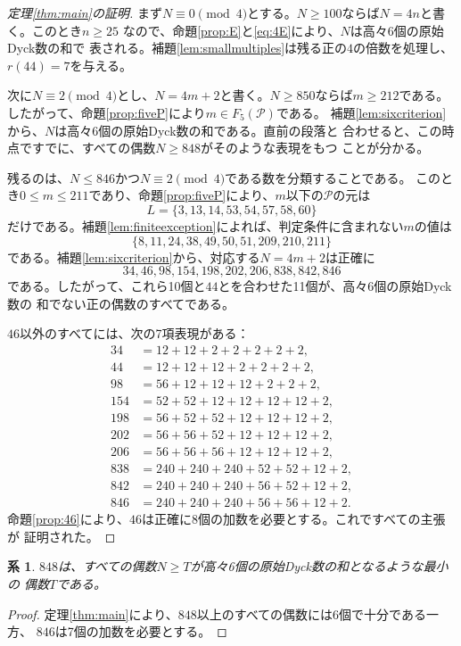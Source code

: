 \documentclass[12pt]{ltjsarticle}
\theoremstyle{plain}
\newtheorem{corollary}[theorem]{系}
\newcommand{\Pset}{\mathcal P}
\begin{document}
\begin{proof}[定理\ref{thm:main}の証明]
まず$N\equiv0\pmod4$とする。$N\geq100$ならば$N=4n$と書く。このとき$n\geq25$
なので、命題\ref{prop:E}と\eqref{eq:4E}により、$N$は高々6個の原始Dyck数の和で
表される。補題\ref{lem:smallmultiples}は残る正の$4$の倍数を処理し、
$r(44)=7$を与える。

次に$N\equiv2\pmod4$とし、$N=4m+2$と書く。$N\geq850$ならば$m\geq212$である。
したがって、命題\ref{prop:fiveP}により$m\in F_5(\Pset)$である。
補題\ref{lem:sixcriterion}から、$N$は高々6個の原始Dyck数の和である。直前の段落と
合わせると、この時点ですでに、すべての偶数$N\geq848$がそのような表現をもつ
ことが分かる。

残るのは、$N\leq846$かつ$N\equiv2\pmod4$である数を分類することである。
このとき$0\leq m\leq211$であり、命題\ref{prop:fiveP}により、$m$以下の$\Pset$の元は
\[
 L=\{3,13,14,53,54,57,58,60\}
\]
だけである。補題\ref{lem:finiteexception}によれば、判定条件に含まれない$m$の値は
\[
 \{8,11,24,38,49,50,51,209,210,211\}
\]
である。補題\ref{lem:sixcriterion}から、対応する$N=4m+2$は正確に
\[
 34,46,98,154,198,202,206,838,842,846
\]
である。したがって、これら10個と$44$とを合わせた11個が、高々6個の原始Dyck数の
和でない正の偶数のすべてである。

$46$以外のすべてには、次の7項表現がある：
\[
\begin{aligned}
34&=12+12+2+2+2+2+2,\\
44&=12+12+12+2+2+2+2,\\
98&=56+12+12+12+2+2+2,\\
154&=52+52+12+12+12+12+2,\\
198&=56+52+52+12+12+12+2,\\
202&=56+56+52+12+12+12+2,\\
206&=56+56+56+12+12+12+2,\\
838&=240+240+240+52+52+12+2,\\
842&=240+240+240+56+52+12+2,\\
846&=240+240+240+56+56+12+2.
\end{aligned}
\]
命題\ref{prop:46}により、$46$は正確に8個の加数を必要とする。これですべての主張が
証明された。
\end{proof}

\begin{corollary}\label{cor:threshold}
$848$は、すべての偶数$N\geq T$が高々6個の原始Dyck数の和となるような最小の
偶数$T$である。
\end{corollary}

\begin{proof}
定理\ref{thm:main}により、$848$以上のすべての偶数には6個で十分である一方、
$846$は7個の加数を必要とする。
\end{proof}
\end{document}
